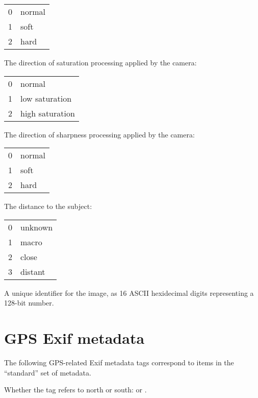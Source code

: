 \begin{tabular}{p{0.3in} p{4in}}
0 & normal \\
1 & soft \\
2 & hard
\end{tabular}
\apiend

The direction of saturation processing applied by the camera:
\medskip

\begin{tabular}{p{0.3in} p{4in}}
0 & normal \\
1 & low saturation \\
2 & high saturation
\end{tabular}
\apiend

The direction of sharpness processing applied by the camera:
\medskip

\begin{tabular}{p{0.3in} p{4in}}
0 & normal \\
1 & soft \\
2 & hard
\end{tabular}
\apiend


The distance to the subject:
\medskip

\begin{tabular}{p{0.3in} p{4in}}
0 & unknown \\
1 & macro \\
2 & close \\
3 & distant
\end{tabular}
\apiend

A unique identifier for the image, as 16 ASCII hexidecimal digits 
representing a 128-bit number.
\apiend


\section{GPS Exif metadata}
\label{sec:metadata:GPS}

The following GPS-related Exif metadata tags correspond to items in the
``standard'' set of metadata.


Whether the  tag refers to north or south:  or 
.
\apiend

